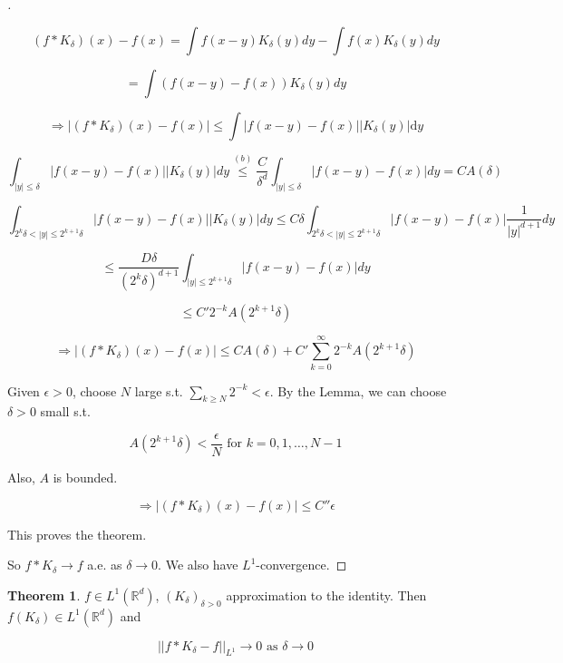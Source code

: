 \documentclass{article}
\theoremstyle{definition}
\newtheorem{thm}{Theorem}
\newenvironment{proofs}[1][\proofname]{%
  \begin{proof}[#1]$ $\par\nobreak\ignorespaces
}{%
  \end{proof}
}
\begin{document}
\begin{proofs}
  $$(f * K_\delta)(x) - f(x) = \int f(x - y) K_\delta (y) dy - \int f(x) K_\delta (y) dy$$

  $$ = \int (f(x - y) - f(x)) K_\delta(y) dy$$

  $$\Rightarrow |(f* K_\delta)(x) - f(x)| \leq \int |f(x - y) - f(x)| |K_\delta(y)| \mathrm{d}y$$

  $$\int_{|y| \leq \delta} |f(x - y) - f(x)| |K_\delta(y)| dy \stackrel{(b)}{\leq} \frac{C}{\delta^d} \int_{|y| \leq \delta} |f(x - y) - f(x)| dy = CA(\delta) $$

  $$\int_{2^k \delta < |y| \leq 2^{k +1 } \delta} |f(x - y) - f(x)| |K_\delta (y)| dy \leq C \delta \int_{2^k  \delta < |y| \leq 2^{k + 1} \delta} |f(x - y) - f(x)| \frac{1}{|y|^{d+1}} dy$$

  $$\leq \frac{D \delta}{(2^k \delta)^{d + 1}} \int_{|y| \leq 2^{k+1} \delta} |f(x - y) - f(x)| dy$$

  $$\leq C' 2^{-k} A(2^{k + 1} \delta)$$

  $$\Rightarrow |(f*K_\delta)(x) - f(x)| \leq CA(\delta) + C' \sum_{k = 0}^\infty 2^{-k} A(2^{k+1} \delta)$$

  Given $\epsilon > 0$, choose $N$ large s.t. $\sum_{k \geq N} 2^{-k} < \epsilon$. By the Lemma, we can choose $\delta > 0$ small s.t. 

  $$A(2^{k +1} \delta) < \frac{\epsilon}{N} \text{ for } k= 0, 1, \hdots, N - 1$$

  Also, $A$ is bounded.

  $$\Rightarrow |(f*K_\delta)(x) - f(x)| \leq C'' \epsilon$$

  This proves the theorem. 

  \par So $f * K_\delta \rightarrow f$ a.e. as $\delta \rightarrow 0$. We also have $L^1$-convergence.


\end{proofs}

\begin{thm}
  $f \in L^1(\mathbb{R}^d)$, $(K_\delta)_{\delta > 0}$ approximation to the identity. Then $f(K_\delta) \in L^1(\mathbb{R}^d)$ and 

  $$||f*K_\delta - f||_{L^1} \rightarrow 0 \text{ as } \delta \rightarrow 0$$
\end{thm}
\end{document}
